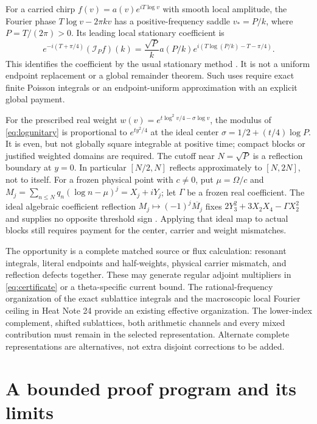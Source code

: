 \documentclass[11pt]{article}
\theoremstyle{definition}
\theoremstyle{remark}
\begin{document}
For a carried chirp $f(v)=a(v)e^{iT\log v}$ with smooth local amplitude,
the Fourier phase $T\log v-2\pi kv$ has a positive-frequency saddle
$v_*=P/k$, where $P=T/(2\pi)>0$. Its leading local stationary coefficient
is
\begin{equation}
 e^{-i(T+\pi/4)}(\mathcal I_Pf)(k)
 =\frac{\sqrt P}{k}a(P/k)
          e^{i(T\log(P/k)-T-\pi/4)}.
 \label{eq:stationary-reflection}
\end{equation}
This identifies the coefficient by the usual stationary method
\cite{dlmfstationary}. It is not a uniform endpoint replacement or a
global remainder theorem. Such uses require exact finite Poisson integrals
or an endpoint-uniform approximation with an explicit global payment.

For the prescribed real weight $w(v)=e^{t\log^2v/4-\sigma\log v}$,
the modulus of \eqref{eq:logunitary} is proportional to $e^{ty^2/4}$
at the ideal center $\sigma=1/2+(t/4)\log P$.
It is even, but not globally square integrable at positive time; compact
blocks or justified weighted domains are required. The cutoff near
$N=\sqrt P$ is a reflection boundary at $y=0$.
In particular $[N/2,N]$ reflects approximately to $[N,2N]$, not to itself.
For a frozen physical point with $c\ne0$, put $\mu=\Omega/c$ and
$M_j=\sum_{n\le N}q_n(\log n-\mu)^j=X_j+iY_j$; let $\Gamma$ be a
frozen real coefficient. The ideal algebraic coefficient reflection
$M_j\mapsto(-1)^j\overline{M_j}$ fixes
$2Y_3^2+3X_2X_4-\Gamma X_2^2$ and supplies no opposite threshold sign
\cite{torusnotes,heat25}. Applying that ideal map to actual blocks still
requires payment for the center, carrier and weight mismatches.

The opportunity is a complete matched source or flux calculation:
resonant integrals, literal endpoints and half-weights, physical carrier
mismatch, and reflection defects together. These may generate regular
adjoint multipliers in \eqref{eq:certificate} or a theta-specific current
bound. The rational-frequency organization of the exact sublattice
integrals and the macroscopic local Fourier ceiling in Heat Note 24
\cite{heatnotes} provide an existing effective organization.
The lower-index complement, shifted
sublattices, both arithmetic channels and every mixed contribution must
remain in the selected representation. Alternate complete representations
are alternatives, not extra disjoint corrections to be added.

\section{A bounded proof program and its limits}
\label{sec:program}
\end{document}
